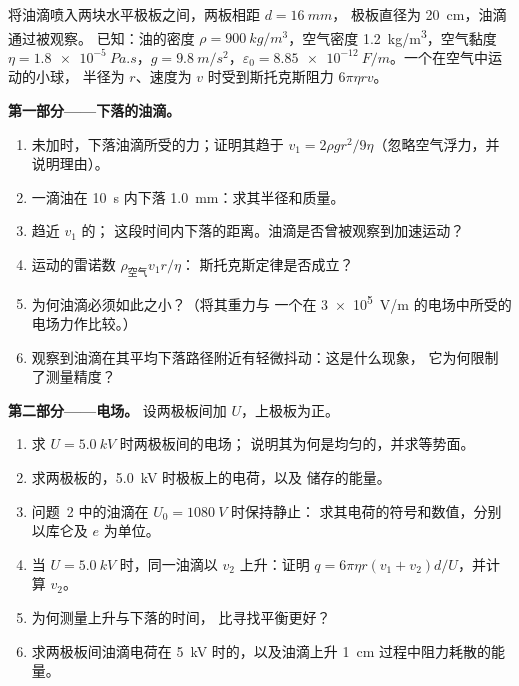 \begin{problem}
\label{pb:b1:potential-capacitors:1}
将油滴喷入两块水平极板之间，两板相距 $d = \qty{16}{mm}$，
极板直径为 \qty{20}{cm}，油滴通过被观察。
已知：油的密度 $\rho = \qty{900}{kg/m^3}$，空气密度
\qty{1.2}{kg/m^3}，空气黏度 $\eta = \qty{1.8e-5}{Pa.s}$，$g =
\qty{9.8}{m/s^2}$，$\varepsilon_0 = \qty{8.85e-12}{F/m}$。一个在空气中运动的小球，
半径为 $r$、速度为 $v$ 时受到斯托克斯阻力 $6\pi\eta rv$。

\medskip
\noindent\textbf{第一部分——下落的油滴。}
\begin{enumerate}
  \item 未加时，下落油滴所受的力；证明其趋于
         $v_1 = 2\rho gr^2/9\eta$（忽略空气浮力，并
        说明理由）。
  \item 一滴油在 \qty{10}{s} 内下落 \qty{1.0}{mm}：求其半径和质量。
  \item 趋近 $v_1$ 的；
        这段时间内下落的距离。油滴是否曾被观察到加速运动？
  \item 运动的雷诺数 $\rho_{\text{空气}}v_1r/\eta$：
        斯托克斯定律是否成立？
  \item 为何油滴必须如此之小？（将其重力与
        一个在
        \qty{3e5}{V/m} 的电场中所受的电场力作比较。）
  \item 观察到油滴在其平均下落路径附近有轻微抖动：这是什么现象，
        它为何限制了测量精度？
\end{enumerate}

\medskip
\noindent\textbf{第二部分——电场。}
设两极板间加 $U$，上极板为正。
\begin{enumerate}[resume]
  \item 求 $U = \qty{5.0}{kV}$ 时两极板间的电场；
        说明其为何是均匀的，并求等势面。
  \item 求两极板的，\qty{5.0}{kV} 时极板上的电荷，以及
        储存的能量。
  \item 问题~2 中的油滴在 $U_0 = \qty{1080}{V}$ 时保持静止：
        求其电荷的符号和数值，分别以库仑及 $e$ 为单位。
  \item 当 $U = \qty{5.0}{kV}$ 时，同一油滴以 $v_2$ 上升：证明
        $q = 6\pi\eta r(v_1 + v_2)d/U$，并计算 $v_2$。
  \item 为何测量上升与下落的时间，
        比寻找平衡更好？
  \item 求两极板间油滴电荷在
        \qty{5}{kV} 时的，以及油滴上升
        \qty{1}{cm} 过程中阻力耗散的能量。
\end{enumerate}


\end{problem}
